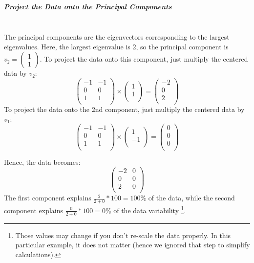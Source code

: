 \documentclass[]{article}
\begin{document}
	\subparagraph{Project the Data onto the Principal Components}
	\noindent\\
	The principal components are the eigenvectors corresponding to the largest eigenvalues.
	Here, the largest eigenvalue is 2, so the principal component is \( v_2 = \begin{pmatrix} 1 \\ 1 \end{pmatrix} \).
	To project the data onto this component, just multiply the centered data by \( v_2 \):
	$$
	\begin{pmatrix}
		-1 & -1 \\
		0 & 0 \\
		1 & 1 \\
	\end{pmatrix}
	\times
	\begin{pmatrix}
		1 \\
		1 \\
	\end{pmatrix}
	=
	\begin{pmatrix}
		-2 \\
		0 \\
		2 \\
	\end{pmatrix}
	$$
	To project the data onto the 2nd component, just multiply the centered data by \( v_1 \):
	$$
	\begin{pmatrix}
		-1 & -1 \\
		0 & 0 \\
		1 & 1 \\
	\end{pmatrix}
	\times
	\begin{pmatrix}
		1 \\
		-1 \\
	\end{pmatrix}
	=
	\begin{pmatrix}
		0 \\
		0 \\
		0 \\
	\end{pmatrix}
	$$
	
	Hence, the data becomes:
	$$
	\begin{pmatrix}
		-2 & 0 \\
		0 & 0 \\
		2 & 0 \\
	\end{pmatrix}
	$$
	The first component explains $\frac{2}{2+0}*100 = 100$\% of the data, while the second component explains $\frac{0}{2+0}*100 = 0$\% of the data variability
	\footnote{
		Those values may change if you don't re-scale the data properly.
		In this particular example, it does not matter (hence we ignored that step to simplify calculations).
	}.
	
	
	
\end{document}
